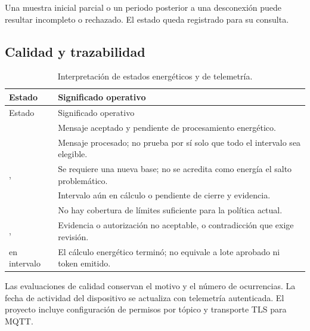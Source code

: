 Una muestra inicial parcial o un periodo posterior a una desconexión puede resultar incompleto o rechazado. El estado queda registrado para su consulta.

\subsection{Calidad y trazabilidad}
\begin{longtable}{L{.26\linewidth}L{.64\linewidth}}
\caption{Interpretación de estados energéticos y de telemetría.}\\
\toprule Estado & Significado operativo \\ \midrule\endfirsthead
\toprule Estado & Significado operativo \\ \midrule\endhead
{} & Mensaje aceptado y pendiente de procesamiento energético.\\
 & Mensaje procesado; no prueba por sí solo que todo el intervalo sea elegible.\\
,  & Se requiere una nueva base; no se acredita como energía el salto problemático.\\
 & Intervalo aún en cálculo o pendiente de cierre y evidencia.\\
 & No hay cobertura de límites suficiente para la política actual.\\
,  & Evidencia o autorización no aceptable, o contradicción que exige revisión.\\
 en intervalo & El cálculo energético terminó; no equivale a lote aprobado ni token emitido.\\
\bottomrule
\end{longtable}
Las evaluaciones de calidad conservan el motivo y el número de ocurrencias. La fecha de actividad del dispositivo se actualiza con telemetría autenticada. El proyecto incluye configuración de permisos por tópico y transporte TLS para MQTT.
